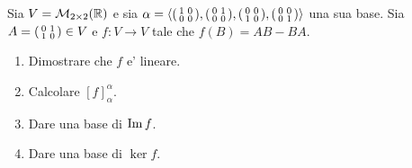 \begin{example}
    Sia $V = \mathcal{M}_{2\times 2}(\mathbb{R})$ e sia $\alpha = \left\langle \begin{psmallmatrix}1&0\\0&0\end{psmallmatrix}, \begin{psmallmatrix}0&1\\0&0\end{psmallmatrix}, \begin{psmallmatrix}0&0\\1&0\end{psmallmatrix}, \begin{psmallmatrix}0&0\\0&1\end{psmallmatrix} \right\rangle$ una sua base.    
    Sia $A = \begin{psmallmatrix}0&1\\1&0\end{psmallmatrix} \in V$ e $f : V \to V$ tale che $f(B) = AB - BA$.
    \begin{enumerate}
        \item Dimostrare che $f$ e' lineare.
        \item Calcolare $[f]^{\alpha}_{\alpha}$.
        \item Dare una base di $\operatorname{Im}f$.
        \item Dare una base di $\ker f$.
    \end{enumerate}
\end{example}
